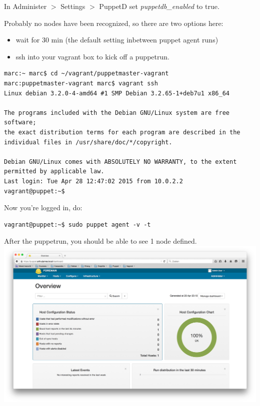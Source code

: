 \documentclass{article}
\begin{document}
\par In Administer $>$ Settings $>$ PuppetD set \emph{puppetdb\_enabled} to true.
\\
\par Probably no nodes have been recognized, so there are two options here:
\begin{itemize}
\item wait for 30 min (the default setting inbetween puppet agent runs)
\item ssh into your vagrant box to kick off a puppetrun.
\end{itemize} 

\begin{verbatim}
marc:~ marc$ cd ~/vagrant/puppetmaster-vagrant
marc:puppetmaster-vagrant marc$ vagrant ssh
Linux debian 3.2.0-4-amd64 #1 SMP Debian 3.2.65-1+deb7u1 x86_64

The programs included with the Debian GNU/Linux system are free software;
the exact distribution terms for each program are described in the
individual files in /usr/share/doc/*/copyright.

Debian GNU/Linux comes with ABSOLUTELY NO WARRANTY, to the extent
permitted by applicable law.
Last login: Tue Apr 28 12:47:02 2015 from 10.0.2.2
vagrant@puppet:~$
\end{verbatim}

\par Now you're logged in, do:\\
\begin{verbatim}
vagrant@puppet:~$ sudo puppet agent -v -t
\end{verbatim}

After the puppetrun, you should be able to see 1 node defined.\\
\includegraphics[scale=0.3]{images/dashboard}
\end{document}
